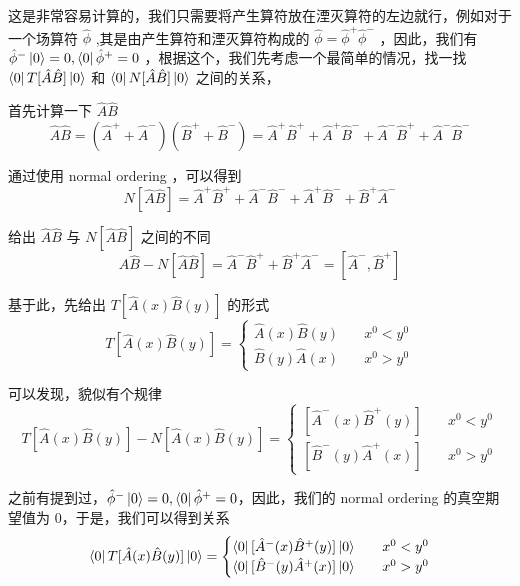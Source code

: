 这是非常容易计算的，我们只需要将产生算符放在湮灭算符的左边就行，例如对于一个场算符 $\hat{\phi}$ ,其是由产生算符和湮灭算符构成的 $\hat{\phi} = \hat{\phi}^+ \hat{\phi}^-$ ，因此，我们有 $\hat{\phi}^-\ket{0} = 0 , \bra{0}\hat{\phi}^+ = 0$ ，根据这个，我们先考虑一个最简单的情况，找一找 $\bra{0}T[\hat{A}\hat{B}]\ket{0}$ 和 $\bra{0}N[\hat{A}\hat{B}]\ket{0}$ 之间的关系，

首先计算一下 $\hat{A}\hat{B}$
\begin{equation}
    \hat{A}\hat{B} = \left(\hat{A}^+ + \hat{A}^-\right)\left(\hat{B}^+ + \hat{B}^-\right) = \hat{A}^+\hat{B}^+ + \hat{A}^+\hat{B}^- + \hat{A}^-\hat{B}^+ + \hat{A}^-\hat{B}^-
\end{equation}

通过使用 normal ordering ，可以得到 
\begin{equation}
    N[\hat{A}\hat{B}] = \hat{A}^+\hat{B}^+ + \hat{A}^-\hat{B}^- + \hat{A}^+\hat{B}^- + \hat{B}^+\hat{A}^-
\end{equation}

给出 $\hat{A}\hat{B}$ 与 $N[\hat{A}\hat{B}]$ 之间的不同
\begin{equation}
    \hat{A}\hat{B} - N[\hat{A}\hat{B}] = \hat{A}^-\hat{B}^+ + \hat{B}^+\hat{A}^- = [\hat{A}^-,\hat{B}^+]
\end{equation}

基于此，先给出 $T[\hat{A}(x)\hat{B}(y)]$ 的形式
\begin{equation}
    T[\hat{A}(x)\hat{B}(y)] = 
    \begin{cases}
        \hat{A}(x)\hat{B}(y) &\quad x^0 < y^0 \\
        \hat{B}(y)\hat{A}(x) &\quad x^0 > y^0 
    \end{cases}
\end{equation}

可以发现，貌似有个规律
\begin{equation}
    T[\hat{A}(x)\hat{B}(y)] - N[\hat{A}(x)\hat{B}(y)] = 
    \begin{cases}
        [\hat{A}^-(x)\hat{B}^+(y)] &\quad x^0 < y^0 \\
        [\hat{B}^-(y)\hat{A}^+(x)] &\quad x^0 > y^0
    \end{cases}
\end{equation}

之前有提到过，$\hat{\phi}^-\ket{0} = 0 , \bra{0}\hat{\phi}^+ = 0$，因此，我们的 normal ordering 的真空期望值为 $0$，于是，我们可以得到关系
\begin{equation}
    \bra{0}T[\hat{A}(x)\hat{B}(y)]\ket{0} = 
    \begin{cases}
        \bra{0}[\hat{A}^-(x)\hat{B}^+(y)]\ket{0} &\quad x^0 < y^0 \\
        \bra{0}[\hat{B}^-(y)\hat{A}^+(x)]\ket{0} &\quad x^0 > y^0
    \end{cases}
\end{equation}

